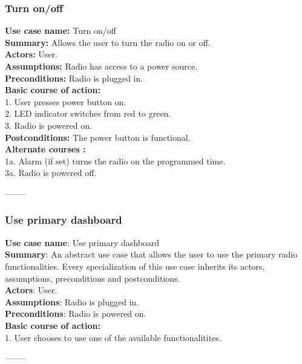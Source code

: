 \documentclass[11pt]{article}
\begin{document}
\subsubsection{Turn on/off}
\textbf{Use case name:} Turn on/off\\
\textbf{Summary:} Allows the user to turn the radio on or off.\\
\textbf{Actors:} User.\\
\textbf{Assumptions:} Radio has access to a power source.\\
\textbf{Preconditions:} Radio is plugged in.\\
\textbf{Basic course of action:}\\
\hspace*{10mm}1. User presses power button on.\\
\hspace*{10mm}2. LED indicator switches from red to green.\\
\hspace*{10mm}3. Radio is powered on.\\
\textbf{Postconditions: }The power button is functional.\\
\textbf{Alternate courses :}\\
\hspace*{10mm}1a. Alarm (if set) turns the radio on the programmed time.\\ 
\hspace*{10mm}3a. Radio is powered off.
\begin{center}--------\end{center}

\subsubsection{Use primary dashboard}
\textbf{Use case name}: Use primary dashboard\\
\textbf{Summary}: An abstract use case that allows the user to use the primary radio functionalities. Every specialization of this use case inherits its actors, assumptions, preconditions and postconditions.\\
\textbf{Actors}: User.\\
\textbf{Assumptions}: Radio is plugged in.\\
\textbf{Preconditions}: Radio is powered on.\\
\textbf{Basic course of action:}\\
\hspace*{10mm}1. User chooses to use one of the available functionalitites.
\begin{center}--------\end{center}
\end{document}
